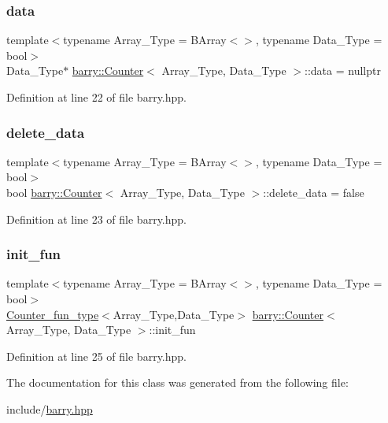 \subsubsection{\texorpdfstring{data}{data}}
{\footnotesize\ttfamily template$<$typename Array\+\_\+\+Type  = B\+Array$<$$>$, typename Data\+\_\+\+Type  = bool$>$ \\
Data\+\_\+\+Type$\ast$ \hyperlink{classbarry_1_1_counter}{barry\+::\+Counter}$<$ Array\+\_\+\+Type, Data\+\_\+\+Type $>$\+::data = nullptr}



Definition at line 22 of file barry.\+hpp.

\mbox{\label{classbarry_1_1_counter_a5445fa47abeff4b5675a5e5c12e4917a}} 
\subsubsection{\texorpdfstring{delete\+\_\+data}{delete\_data}}
{\footnotesize\ttfamily template$<$typename Array\+\_\+\+Type  = B\+Array$<$$>$, typename Data\+\_\+\+Type  = bool$>$ \\
bool \hyperlink{classbarry_1_1_counter}{barry\+::\+Counter}$<$ Array\+\_\+\+Type, Data\+\_\+\+Type $>$\+::delete\+\_\+data = false}



Definition at line 23 of file barry.\+hpp.

\mbox{\label{classbarry_1_1_counter_a2509d75d3fc9e33d708911a38373d8ab}} 
\subsubsection{\texorpdfstring{init\+\_\+fun}{init\_fun}}
{\footnotesize\ttfamily template$<$typename Array\+\_\+\+Type  = B\+Array$<$$>$, typename Data\+\_\+\+Type  = bool$>$ \\
\hyperlink{namespacebarry_abaaae3200da8e4b7faac3c04fe9c3081}{Counter\+\_\+fun\+\_\+type}$<$Array\+\_\+\+Type,Data\+\_\+\+Type$>$ \hyperlink{classbarry_1_1_counter}{barry\+::\+Counter}$<$ Array\+\_\+\+Type, Data\+\_\+\+Type $>$\+::init\+\_\+fun}



Definition at line 25 of file barry.\+hpp.



The documentation for this class was generated from the following file\+:\begin{DoxyCompactItemize}
\item 
include/\hyperlink{barry_8hpp}{barry.\+hpp}\end{DoxyCompactItemize}
